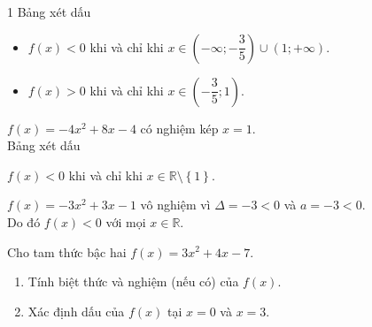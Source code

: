 \begin{bt}
{\begin{enumEX}[a)]{1}
			Bảng xét dấu
			\begin{center}
			\end{center}
			\begin{itemize}
				\item $f(x)<0$ khi và chỉ khi $x\in\left(-\infty;-\dfrac{3}{5}\right)\cup(1;+\infty)$.
				\item $f(x)>0$ khi và chỉ khi $x\in\left(-\dfrac{3}{5};1\right)$.
			\end{itemize}
			\item $f(x)=-4x^2+8x-4$ có nghiệm kép $x=1$.\\
			Bảng xét dấu
			\begin{center}
			\end{center}
			$f(x)<0$ khi và chỉ khi $x\in\mathbb{R}\setminus\left\{1\right\}$.
			\item $f(x)=-3x^2+3x-1$ vô nghiệm vì $\Delta=-3<0$ và $a=-3<0$.\\
			Do đó $f(x)<0$ với mọi $x\in\mathbb{R}$.
		\end{enumEX}
	}
\end{bt}

\begin{bt}%
	Cho tam thức bậc hai $f(x)=3x^2+4x-7$.
	\begin{enumerate}
		\item Tính biệt thức và nghiệm (nếu có) của $f(x)$.
		\item Xác định dấu của $f(x)$ tại $x=0$ và $x=3$.
	\end{enumerate}
\end{bt}

